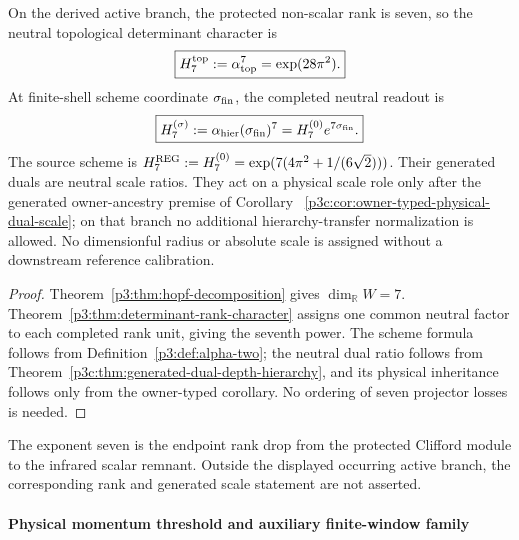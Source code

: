 \documentclass[12pt,a4paper]{article}
\begin{document}
\begin{corollary}
\label{p3:cor:hierarchy-factor}
On the derived active branch, the protected non-scalar rank is seven, so the
neutral topological determinant character is
\begin{equation}
        \boxed{H_7^{\rm top}:=\alpha_{\rm top}^{7}=\exp(28\pi^2).}
\end{equation}
At finite-shell scheme coordinate \(\sigma_{\rm fin}\), the completed neutral
readout is
\begin{equation}
        \boxed{H_7^{(\sigma)}
        :=\alpha_{\rm hier}(\sigma_{\rm fin})^{7}
        =H_7^{(0)}e^{7\sigma_{\rm fin}}.}
\end{equation}
The source scheme is \(H_7^{\rm REG}:=H_7^{(0)}
=\exp(7(4\pi^2+1/(6\sqrt2)))\).  Their generated duals are neutral scale
ratios.  They act on a physical scale role only after the generated
owner-ancestry premise of Corollary~
\ref{p3c:cor:owner-typed-physical-dual-scale}; on that branch no additional
hierarchy-transfer normalization is allowed.  No dimensionful radius or
absolute scale is assigned without a downstream reference calibration.
\end{corollary}

\begin{proof}
Theorem~\ref{p3:thm:hopf-decomposition} gives \(\dim_{\mathbb R}W=7\).
Theorem~\ref{p3:thm:determinant-rank-character} assigns one common neutral
factor to each completed rank unit, giving the seventh power.  The scheme
formula follows from Definition~\ref{p3:def:alpha-two}; the neutral dual ratio
follows from Theorem~\ref{p3c:thm:generated-dual-depth-hierarchy}, and its
physical inheritance follows only from the owner-typed corollary.  No ordering
of seven projector losses is needed.
\end{proof}

\begin{remark}
The exponent seven is the endpoint rank drop from the protected Clifford
module to the infrared scalar remnant.  Outside the displayed occurring
active branch, the corresponding rank and generated scale statement are not
asserted.
\end{remark}

\paragraph{Physical momentum threshold and auxiliary finite-window family}
\label{p3:app:decoupling}
\end{document}
